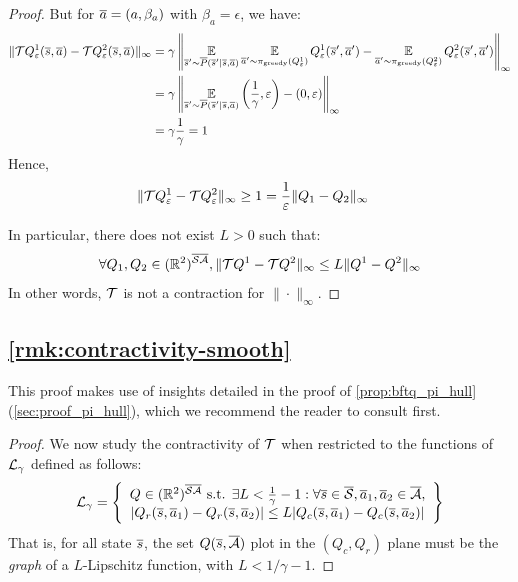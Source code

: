 \begin{subappendices}
\begin{proof}
	But for $\overline{a}=(a,\beta_a)$ with $\beta_a = \epsilon$, we have:
	\begin{align*}
	\|\mathcal{T} Q_\varepsilon^1(\overline{s}, \overline{a}) - \mathcal{T} Q_\varepsilon^2(\overline{s}, \overline{a})\|_\infty &= \gamma\left\|\operatorname*{\mathbb{E}}\limits_{\overline{s}'\sim\overline{P}(\overline{s}'|\overline{s},\overline{a})} \operatorname*{\mathbb{E}}\limits_{\overline{a}'\sim\pi_\text{greedy}(Q^1_\varepsilon)}Q^1_\varepsilon(\overline{s}',\overline{a}') - \operatorname*{\mathbb{E}}\limits_{\overline{a}'\sim\pi_\text{greedy}(Q^2_\varepsilon)}Q^2_\varepsilon(\overline{s}',\overline{a}')\right\|_\infty \\
	&= \gamma\left\|\operatorname*{\mathbb{E}}\limits_{\overline{s}'\sim\overline{P}(\overline{s}'|\overline{s},\overline{a})}\left(\frac{1}{\gamma}, \varepsilon\right) - (0, \varepsilon)\right\|_\infty \\
	&= \gamma\frac{1}{\gamma} = 1
	\end{align*}
	Hence, 
	\begin{align*}
	\|\mathcal{T} Q_\varepsilon^1 - \mathcal{T} Q_\varepsilon^2\|_\infty &\geq 1 = \frac{1}{\varepsilon} \|Q_1-Q_2\|_\infty
	\end{align*}
	
	In particular, there does not exist $L>0$ such that:
	$$\forall Q_1,Q_2\in(\mathbb{R}^2)^{\overline{\mathcal{S}}\overline{\mathcal{A}}}, \|\mathcal{T} Q^1 - \mathcal{T} Q^2\|_\infty \leq L \|Q^1 - Q^2\|_\infty$$
	In other words, $\mathcal{T}$ is not a contraction for $\|\cdot\|_\infty$.
\end{proof}

\subsection{\autoref{rmk:contractivity-smooth}}
\label{proof:contraction-with-smooth}

\begin{remark}
	\begin{leftbar}[remarkbar]
	This proof makes use of insights detailed in the proof of \autoref{prop:bftq_pi_hull} (\autoref{sec:proof_pi_hull}), which we recommend the reader to consult first.
	\end{leftbar}
\end{remark}

\begin{proof}
	We now study the contractivity of $\mathcal{T}$ when restricted to the functions of $\mathcal{L}_\gamma$ defined as follows:
	\begin{equation}
	\mathcal{L}_\gamma = \left\{\begin{array}{cc}
	Q\in(\mathbb{R}^2)^{\overline{\mathcal{S}}\overline{\mathcal{A}}}\text{ s.t. }\exists L<\frac{1}{\gamma}-1: \forall \overline{s}\in\overline{\mathcal{S}},\overline{a}_1,\overline{a}_2\in\overline{\mathcal{A}},   \\
	|Q_r(\overline{s},\overline{a}_1) - Q_r(\overline{s},\overline{a}_2)| \leq L|Q_c(\overline{s},\overline{a}_1) - Q_c(\overline{s},\overline{a}_2)|
	\end{array}\right\}
	\end{equation}
	That is, for all state $\overline{s}$, the set $Q(\overline{s}, \overline{\mathcal{A}})$ plot in the $(Q_c,Q_r)$ plane must be the \emph{graph} of a $L$-Lipschitz function, with $L<1/\gamma-1$.
	

\end{proof}
\end{subappendices}
